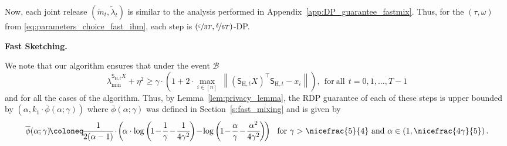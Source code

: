 \documentclass[11pt]{article}
\theoremstyle{definition}
\theoremstyle{plain}
\providecommand{\sectionref}[1]{Section~\ref{#1}}
\providecommand{\lemmaref}[1]{Lemma~\ref{#1}}
\providecommand{\appendixref}[1]{Appendix~\ref{#1}}
\newcommand{\eps}{{\varepsilon}}
\newcommand{\Norm}[1]{\left\| #1 \right\|}
\providecommand{\norm}[1]{\Norm{#1}}
\renewcommand{\eps}{\varepsilon}
\begin{document}
Now, each joint release $\left(\widetilde{m}_t, \widetilde{\lambda}_t\right)$ is similar to the analysis performed in \appendixref{app:DP_guarantee_fastmix}. Thus, for the $(\tau, \omega)$ from \eqref{eq:parameters_choice_fast_ihm}, each step is $\left(\nicefrac{\eps}{3T},\nicefrac{\delta}{6T} \right)$-DP. 


\textbf{Fast Sketching.}

We note that our algorithm ensures that under the event $\mathcal{B}$
\begin{equation}
    \label{eq:guarantee_eigenvalue_sketching}
    \lambda^{\mathsf{S}_{\mathrm{H}, t}X}_{\min} + \eta^2 \geq \gamma\cdot \left(1 + 2 \cdot \underset{i\in [n]}{\max} \ \norm{\left(\mathsf{S}_{\mathrm{H}, t}X\right)^{\top}\mathsf{S}_{\mathrm{H}, t} - x_i}\right), \ \ \mathrm{for\ all} \ \ t=0,1,\ldots, T-1    
\end{equation}
and for all the cases of the algorithm. Thus, by \lemmaref{lem:privacy_lemma}, the RDP guarantee of each of these steps is upper bounded by $\left(\alpha, k_1 \cdot\overline{\phi}(\alpha;\gamma)\right)$ where $\overline{\phi}(\alpha; \gamma)$ was defined in \sectionref{s:fast_mixing} and is given by  
\begin{equation}
    \overline{\phi}(\alpha; \gamma) \hspace{-0.15em}\coloneq\hspace{-0.15em} \frac{1}{2(\alpha - 1)}\hspace{-0.15em}\cdot\hspace{-0.15em} \left(\hspace{-0.15em}\alpha \cdot \log\left(\hspace{-0.15em}1 \hspace{-0.15em}-\hspace{-0.15em} \frac{1}{\gamma} \hspace{-0.15em}-\hspace{-0.15em} \frac{1}{4\gamma^2}\hspace{-0.15em}\right) \hspace{-0.15em}-\hspace{-0.15em} \log\left(\hspace{-0.15em}1 \hspace{-0.15em}-\hspace{-0.15em} \frac{\alpha}{\gamma} \hspace{-0.15em}-\hspace{-0.15em} \frac{\alpha^2}{4\gamma^2}\hspace{-0.15em}\right)\hspace{-0.15em}\right)\ \ \mathrm{for} \ \gamma > \nicefrac{5}{4} \ \mathrm{and} \ \alpha \in \left(1, \nicefrac{4\gamma}{5}\right).
\end{equation}
\end{document}
